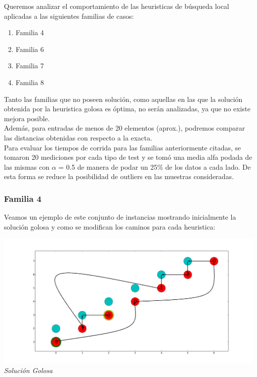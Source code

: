 Queremos analizar el comportamiento de las heuristicas de búsqueda local aplicadas a las siguientes familias de casos:

\begin{enumerate}
\item Familia 4
\item Familia 6
\item Familia 7
\item Familia 8
\end{enumerate}

Tanto las familias que no  poseen solución, como aquellas en las que la solución obtenida por la heuristica golosa es óptima, no serán analizadas, ya que no existe mejora posible.\\

Además, para entradas de menos de 20 elementos (aprox.), podremos comparar las distancias obtenidas con respecto a la exacta.\\
 
Para evaluar los tiempos de corrida para las familias anteriormente citadas, se tomaron 20 mediciones por cada tipo de test y se tomó una media alfa podada de las mismas con $\alpha$ = 0.5 de manera de podar un 25\% de los datos a cada lado. De esta forma se reduce la posibilidad de outliers en las muestras consideradas.

\subsubsection*{Familia 4}

Veamos un ejemplo de este conjunto de instancias mostrando inicialmente la soluci\'on golosa y como se modifican los caminos para cada heuristica:

\vspace*{0.3cm} \vspace*{0.3cm}
  \begin{center}
 \includegraphics[scale=0.3]{./EJ3/gym0goloso.png}\\
 {            \textit{Soluci\'on Golosa}}
  \end{center}
  \vspace*{0.3cm}

